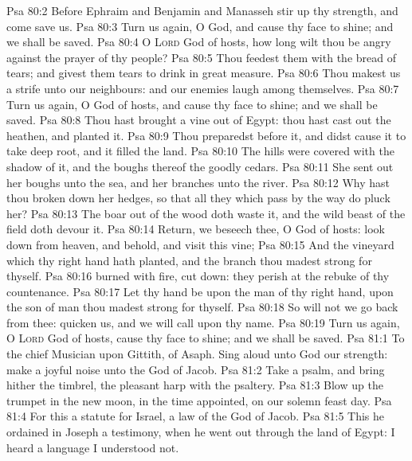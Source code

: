 \vs Psa 80:2 Before Ephraim and Benjamin and Manasseh stir up thy strength, and come  save us.
\vs Psa 80:3 Turn us again, O God, and cause thy face to shine; and we shall be saved.
\vs Psa 80:4 O \textsc{Lord} God of hosts, how long wilt thou be angry against the prayer of thy people?
\vs Psa 80:5 Thou feedest them with the bread of tears; and givest them tears to drink in great measure.
\vs Psa 80:6 Thou makest us a strife unto our neighbours: and our enemies laugh among themselves.
\vs Psa 80:7 Turn us again, O God of hosts, and cause thy face to shine; and we shall be saved.
\vs Psa 80:8 Thou hast brought a vine out of Egypt: thou hast cast out the heathen, and planted it.
\vs Psa 80:9 Thou preparedst  before it, and didst cause it to take deep root, and it filled the land.
\vs Psa 80:10 The hills were covered with the shadow of it, and the boughs thereof  the goodly cedars.
\vs Psa 80:11 She sent out her boughs unto the sea, and her branches unto the river.
\vs Psa 80:12 Why hast thou  broken down her hedges, so that all they which pass by the way do pluck her?
\vs Psa 80:13 The boar out of the wood doth waste it, and the wild beast of the field doth devour it.
\vs Psa 80:14 Return, we beseech thee, O God of hosts: look down from heaven, and behold, and visit this vine;
\vs Psa 80:15 And the vineyard which thy right hand hath planted, and the branch  thou madest strong for thyself.
\vs Psa 80:16  burned with fire,  cut down: they perish at the rebuke of thy countenance.
\vs Psa 80:17 Let thy hand be upon the man of thy right hand, upon the son of man  thou madest strong for thyself.
\vs Psa 80:18 So will not we go back from thee: quicken us, and we will call upon thy name.
\vs Psa 80:19 Turn us again, O \textsc{Lord} God of hosts, cause thy face to shine; and we shall be saved.
\vs Psa 81:1 To the chief Musician upon Gittith,  of Asaph. Sing aloud unto God our strength: make a joyful noise unto the God of Jacob.
\vs Psa 81:2 Take a psalm, and bring hither the timbrel, the pleasant harp with the psaltery.
\vs Psa 81:3 Blow up the trumpet in the new moon, in the time appointed, on our solemn feast day.
\vs Psa 81:4 For this  a statute for Israel,  a law of the God of Jacob.
\vs Psa 81:5 This he ordained in Joseph  a testimony, when he went out through the land of Egypt:  I heard a language  I understood not.
